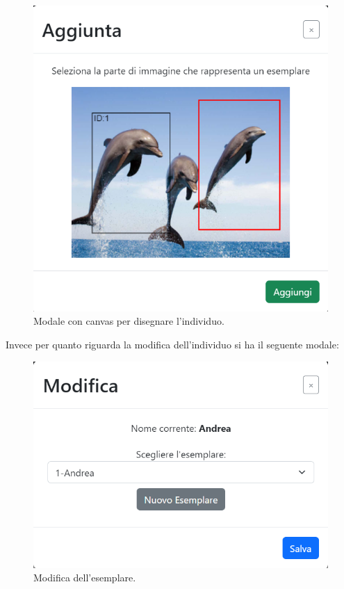 \documentclass[a4paper,final,12pt]{report}
\begin{document}
\begin{figure}[hbtp]
\centering
\includegraphics[scale=0.80]{img_concettuale/addEsempl.png}
\caption{Modale con canvas per disegnare l'individuo.}
\end{figure}
\newpage
Invece per quanto riguarda la modifica dell'individuo si ha il seguente modale:
\begin{figure}[hbtp]
\centering
\includegraphics[scale=0.90]{img_concettuale/modificaNome.png}
\caption{Modifica dell'esemplare.}
\end{figure}
\end{document}
